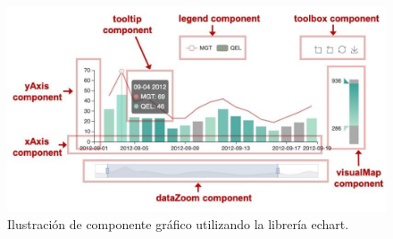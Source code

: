 \begin{figure}[htpb]
	\centering
	\includegraphics[scale=.60]{./Figures/echart-grafica.png}
	\caption[Componente gráfico de echarts]{Ilustración de componente gráfico utilizando la librería echart\protect\footnotemark.}
	\label{fig:echart-grafica}
\end{figure}



